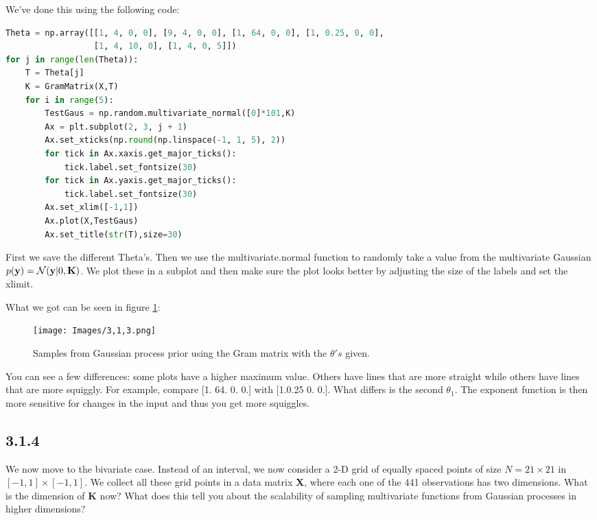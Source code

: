 \documentclass[a4paper]{article}
\begin{document}
We've done this using the following code:


\begin{lstlisting}[language=Python]
Theta = np.array([[1, 4, 0, 0], [9, 4, 0, 0], [1, 64, 0, 0], [1, 0.25, 0, 0],
                  [1, 4, 10, 0], [1, 4, 0, 5]])
for j in range(len(Theta)):
    T = Theta[j]
    K = GramMatrix(X,T) 
    for i in range(5):
        TestGaus = np.random.multivariate_normal([0]*101,K)
        Ax = plt.subplot(2, 3, j + 1)
        Ax.set_xticks(np.round(np.linspace(-1, 1, 5), 2))
        for tick in Ax.xaxis.get_major_ticks():
            tick.label.set_fontsize(30)
        for tick in Ax.yaxis.get_major_ticks():
            tick.label.set_fontsize(30)
        Ax.set_xlim([-1,1])
        Ax.plot(X,TestGaus)
        Ax.set_title(str(T),size=30)
\end{lstlisting}

First we save the different Theta's. Then we use the multivariate.normal function to randomly take a value from the multivariate Gaussian $p(\textbf y) = \mathcal N (\textbf y | 0,\textbf K)$. We plot these in a subplot and then make sure the plot looks better by adjusting the size of the labels and set the xlimit.

What we got can be seen in figure \ref{3.1.3}:

\begin{figure}[H]
\texttt{[image: Images/3,1,3.png]}
\caption{Samples from Gaussian process prior using the Gram matrix with the $\theta's$ given.}
\label{3.1.3}
\end{figure}

You can see a few differences: some plots have a higher maximum value. Others have lines that are more straight while others have lines that are more squiggly. For example, compare [1. 64. 0. 0.] with [1.0.25 0. 0.]. What differs is the second $\theta_1$. The exponent function is then more sensitive for changes in the input and thus you get more squiggles. 

\subsection*{3.1.4}

We now move to the bivariate case. Instead of an interval, we now consider a 2-D grid of equally spaced points of size $N = 21 \times 21$ in $[-1,1] \times [-1,1]$. We collect all these grid points in a data matrix \textbf{X}, where each one of the 441 observations has two dimensions. What is the dimension of \textbf{K} now? What does this tell you about the scalability of sampling multivariate functions from Gaussian processes in higher dimensions?\\
\end{document}
